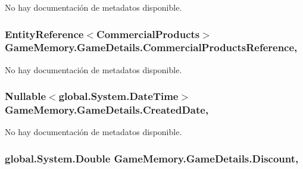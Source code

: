 No hay documentación de metadatos disponible. 

\hypertarget{class_game_memory_1_1_game_details_aa3f59a33dd428d393dc3e08585dcff18}{
\subsubsection[{Commercial\-Products\-Reference}]{\setlength{\rightskip}{0pt plus 5cm}Entity\-Reference$<${\bf Commercial\-Products}$>$ Game\-Memory.\-Game\-Details.\-Commercial\-Products\-Reference\hspace{0.3cm}{\ttfamily [get]}, {\ttfamily [set]}}}\label{class_game_memory_1_1_game_details_aa3f59a33dd428d393dc3e08585dcff18}


No hay documentación de metadatos disponible. 

\hypertarget{class_game_memory_1_1_game_details_a2d785c106ffd77c7ed2f999bcc6d5749}{
\subsubsection[{Created\-Date}]{\setlength{\rightskip}{0pt plus 5cm}Nullable$<$global.\-System.\-Date\-Time$>$ Game\-Memory.\-Game\-Details.\-Created\-Date\hspace{0.3cm}{\ttfamily [get]}, {\ttfamily [set]}}}\label{class_game_memory_1_1_game_details_a2d785c106ffd77c7ed2f999bcc6d5749}


No hay documentación de metadatos disponible. 

\hypertarget{class_game_memory_1_1_game_details_a1752c3c4d5f63161c372ae8c9742f7fb}{
\subsubsection[{Discount}]{\setlength{\rightskip}{0pt plus 5cm}global.\-System.\-Double Game\-Memory.\-Game\-Details.\-Discount\hspace{0.3cm}{\ttfamily [get]}, {\ttfamily [set]}}}\label{class_game_memory_1_1_game_details_a1752c3c4d5f63161c372ae8c9742f7fb}


